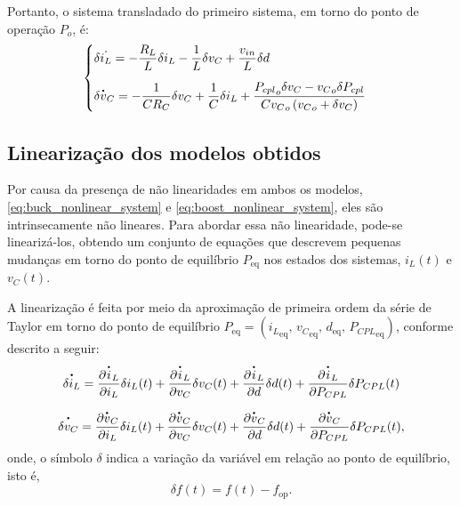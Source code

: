 Portanto, o sistema transladado do primeiro sistema, em torno do ponto de operação $P_o$, é: \begin{equation}
  \begin{cases}
    \displaystyle \delta \dot{i_L} = - \frac{R_L}{L} \delta i_L - \frac{1}{L} \delta v_C  + \frac{v_{in}}{L} \delta d \\[12pt]
    \displaystyle \delta \dt{v}_C = - \frac{1}{C R_C} \delta v_C  + \frac{1}{C}  \delta i_L + \frac{{P_{cpl}}_o \delta v_C - {v_C}_o \delta P_{cpl}}{C {v_C}_o \left({v_C}_o + \delta v_C\right)}
  \end{cases}
\end{equation}

\subsection{Linearização dos modelos obtidos}

Por causa da presença de não linearidades em ambos os modelos, \eqref{eq:buck_nonlinear_system} e \eqref{eq:boost_nonlinear_system}, eles são intrinsecamente não lineares. Para abordar essa não linearidade, pode-se linearizá-los, obtendo um conjunto de equações que descrevem pequenas mudanças em torno do ponto de equilíbrio $P_{\text{eq}}$ nos estados dos sistemas, $i_L(t)$ e $v_C(t)$.

A linearização é feita por meio da aproximação de primeira ordem da série de Taylor em torno do ponto de equilíbrio $P_{\text{eq}} = ({i_L}_{\text{eq}}, \, {v_C}_{\text{eq}}, \, {d}_{\text{eq}}, \, {P_{CPL}}_{\text{eq}})$, conforme descrito a seguir: \begin{gather}  \dt{\delta i_L} = \frac{\partial \dt{i}_L}{\partial i_L}\delta i_L(t) + \frac{\partial \dt{i}_L}{\partial v_C}\delta v_C(t) + \frac{\partial {\dt{i}_L}}{\partial d}\delta d(t) + \frac{\partial {\dt{i}_L}}{\partial P_{CPL}}\delta P_{CPL}(t) \\ \nonumber \\ \dt{\delta v_C} = \frac{\partial \dt{v}_C}{\partial i_L}\delta i_L(t) + \frac{\partial \dt{v}_C}{\partial v_C}\delta v_C(t) + \frac{\partial \dt{v}_C}{\partial d}\delta d(t) + \frac{\partial \dt{v}_C}{\partial P_{CPL}}\delta P_{CPL}(t), \end{gather} onde, o símbolo $\delta$ indica a variação da variável em relação ao ponto de equilíbrio, isto é, \begin{equation} \delta f(t) = f(t) - f_{\text{op}}. \label{eq:delta}\end{equation}

